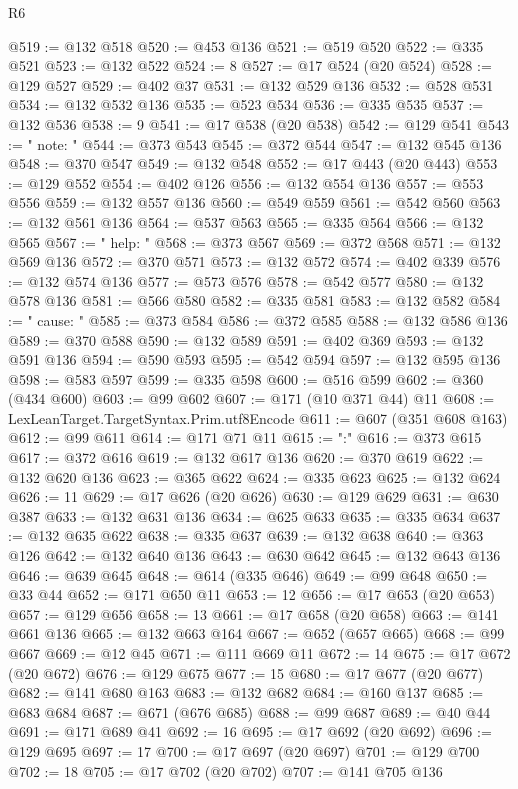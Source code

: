 \begin{lexlean}{R6}
\begin{coremodule}
{{{{{{{{{{{{{{{{{{{{{{{{{{{{{{{{{{{{{{{{{{{{{{{{{{@519 := @132 @518
@520 := @453 @136
@521 := @519 @520
@522 := @335 @521
@523 := @132 @522
@524 := 8
@527 := @17 @524 (@20 @524)
@528 := @129 @527
@529 := @402 @37
@531 := @132 @529 @136
@532 := @528 @531
@534 := @132 @532 @136
@535 := @523 @534
@536 := @335 @535
@537 := @132 @536
@538 := 9
@541 := @17 @538 (@20 @538)
@542 := @129 @541
@543 := "  note: "
@544 := @373 @543
@545 := @372 @544
@547 := @132 @545 @136
@548 := @370 @547
@549 := @132 @548
@552 := @17 @443 (@20 @443)
@553 := @129 @552
@554 := @402 @126
@556 := @132 @554 @136
@557 := @553 @556
@559 := @132 @557 @136
@560 := @549 @559
@561 := @542 @560
@563 := @132 @561 @136
@564 := @537 @563
@565 := @335 @564
@566 := @132 @565
@567 := "  help: "
@568 := @373 @567
@569 := @372 @568
@571 := @132 @569 @136
@572 := @370 @571
@573 := @132 @572
@574 := @402 @339
@576 := @132 @574 @136
@577 := @573 @576
@578 := @542 @577
@580 := @132 @578 @136
@581 := @566 @580
@582 := @335 @581
@583 := @132 @582
@584 := "  cause: "
@585 := @373 @584
@586 := @372 @585
@588 := @132 @586 @136
@589 := @370 @588
@590 := @132 @589
@591 := @402 @369
@593 := @132 @591 @136
@594 := @590 @593
@595 := @542 @594
@597 := @132 @595 @136
@598 := @583 @597
@599 := @335 @598
@600 := @516 @599
@602 := @360 (@434 @600)
@603 := @99 @602
@607 := @171 (@10 @371 @44) @11
@608 := LexLeanTarget.TargetSyntax.Prim.utf8Encode
@611 := @607 (@351 @608 @163)
@612 := @99 @611
@614 := @171 @71 @11
@615 := ":"
@616 := @373 @615
@617 := @372 @616
@619 := @132 @617 @136
@620 := @370 @619
@622 := @132 @620 @136
@623 := @365 @622
@624 := @335 @623
@625 := @132 @624
@626 := 11
@629 := @17 @626 (@20 @626)
@630 := @129 @629
@631 := @630 @387
@633 := @132 @631 @136
@634 := @625 @633
@635 := @335 @634
@637 := @132 @635 @622
@638 := @335 @637
@639 := @132 @638
@640 := @363 @126
@642 := @132 @640 @136
@643 := @630 @642
@645 := @132 @643 @136
@646 := @639 @645
@648 := @614 (@335 @646)
@649 := @99 @648
@650 := @33 @44
@652 := @171 @650 @11
@653 := 12
@656 := @17 @653 (@20 @653)
@657 := @129 @656
@658 := 13
@661 := @17 @658 (@20 @658)
@663 := @141 @661 @136
@665 := @132 @663 @164
@667 := @652 (@657 @665)
@668 := @99 @667
@669 := @12 @45
@671 := @111 @669 @11
@672 := 14
@675 := @17 @672 (@20 @672)
@676 := @129 @675
@677 := 15
@680 := @17 @677 (@20 @677)
@682 := @141 @680 @163
@683 := @132 @682
@684 := @160 @137
@685 := @683 @684
@687 := @671 (@676 @685)
@688 := @99 @687
@689 := @40 @44
@691 := @171 @689 @41
@692 := 16
@695 := @17 @692 (@20 @692)
@696 := @129 @695
@697 := 17
@700 := @17 @697 (@20 @697)
@701 := @129 @700
@702 := 18
@705 := @17 @702 (@20 @702)
@707 := @141 @705 @136
}}}}}}}}}}}}}}}}}}}}}}}}}}}}}}}}}}}}}}}}}}}}}}}}}}
\end{coremodule}
\end{lexlean}
